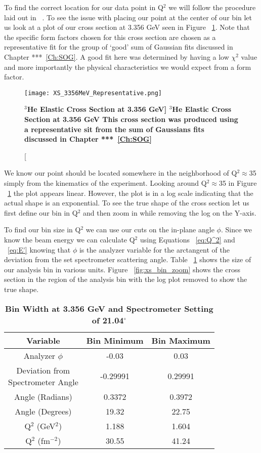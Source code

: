 To find the correct location for our data point in Q$^2$ we will follow the procedure laid out in ~\cite{Article:data_placement}. To see the issue with placing our point at the center of our bin let us look at a plot of our cross section at 3.356 GeV seen in Figure ~\ref{fig:xs_bin}. Note that the specific form factors chosen for this cross section are chosen as a representative fit for the group of `good' sum of Gaussian fits discussed in Chapter ***~\ref{Ch:SOG}. A good fit here was determined by having a low $\chi^2$ value and more importantly the physical characteristics we would expect from a form factor. 

\begin{figure}[!ht]
\begin{center}
\texttt{[image: XS\_3356MeV\_Representative.png]}
\end{center}
\caption[\bf{$^3$He Elastic Cross Section at 3.356 GeV}]{
{\bf{$^3$He Elastic Cross Section at 3.356 GeV}} This cross section was produced using a representative sit from the sum of Gaussians fits discussed in Chapter ***~\ref{Ch:SOG}}
\label{fig:xs_bin}
\end{figure}

We know our point should be located somewhere in the neighborhood of Q$^2 \approx$35 simply from the kinematics of the experiment. Looking around Q$^2 \approx$35 in Figure ~\ref{fig:xs_bin} the plot appears linear. However, the plot is in a log scale indicating that the actual shape is an exponential. To see the true shape of the cross section let us first define our bin in Q$^2$ and then zoom in while removing the log on the Y-axis. 

To find our bin size in Q$^2$ we can use our cuts on the in-plane angle $\phi$. Since we know the beam energy we can calculate Q$^2$ using Equations ~\ref{eq:Q^2} and ~\ref{eq:E'} knowing that $\phi$ is the analyzer variable for the arctangent of the deviation from the set spectrometer scattering angle. Table ~\ref{tab:bin} shows the size of our analysis bin in various units. Figure ~\ref{fig:xs_bin_zoom} shows the cross section in the region of the analysis bin with the log plot removed to show the true shape.

\begin{table}[!h]
\centering
\begin{tabular}{|c | c c |}
\hline
\textbf{Variable} & \textbf{Bin Minimum} & \textbf{Bin Maximum}\\
\hline
Analyzer $\phi$ & -0.03 & 0.03\\ 
\makecell{Deviation from \\ Spectrometer Angle} & -0.29991 & 0.29991\\
Angle (Radians) & 0.3372 &  0.3972\\
Angle (Degrees) & 19.32 & 22.75\\
Q$^2$ (GeV$^2$) & 1.188 & 1.604\\
Q$^2$ (fm$^{-2}$) & 30.55 & 41.24\\
\hline
\end{tabular}
\caption{{\bf{Bin Width at 3.356 GeV and Spectrometer Setting of 21.04$^\circ$}} }
\label{tab:bin}
\end{table}

